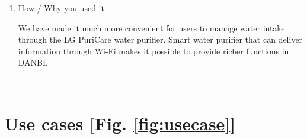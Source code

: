 \documentclass[conference]{IEEEtran}
\begin{document}
\begin{itemize}
\begin{enumerate}
        
        \item How / Why you used it
        
        We have made it much more convenient for users to manage water intake through the LG PuriCare water purifier. Smart water purifier that can deliver information through Wi-Fi makes it possible to provide richer functions in DANBI.
        
        
    \end{enumerate}
\end{itemize}

\ 

\section{Use cases [Fig. \ref{fig:usecase}]}
\end{document}
